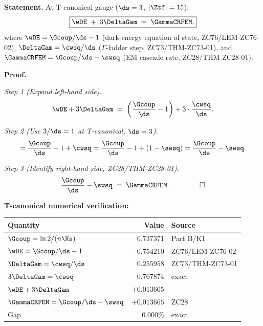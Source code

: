 \documentclass[12pt, a4paper]{article}
\begin{document}

\begin{formalbox}[title={THM-ZC82-01: Cosmological-Ladder Identity
  ($R_0$, Exact)}]

\textbf{Statement.}
At T-canonical gauge ($\ds = 3$, $|\Ztf| = 15$):
\begin{equation}
  \boxed{
    \wDE \;+\; 3\DeltaGam \;=\; \GammaCRFEM,
  }
  \label{eq:cosmo-ladder}
\end{equation}
where $\wDE = \Gcoup/\ds - 1$ (dark-energy equation of state,
ZC76/LEM-ZC76-02), $\DeltaGam = \cwsq/\ds$ ($\Gamma$-ladder step,
ZC73/THM-ZC73-01), and $\GammaCRFEM = \Gcoup/\ds - \swsq$
(EM cascade rate, ZC28/THM-ZC28-01).

\textbf{Proof.}

\textit{Step 1 (Expand left-hand side).}
\begin{equation}
  \wDE + 3\DeltaGam
  \;=\; \left(\frac{\Gcoup}{\ds} - 1\right)
       + 3\cdot\frac{\cwsq}{\ds}.
  \label{eq:expand}
\end{equation}

\textit{Step 2 (Use $3/\ds = 1$ at T-canonical, $\ds = 3$).}
\begin{equation}
  = \frac{\Gcoup}{\ds} - 1 + \cwsq
  = \frac{\Gcoup}{\ds} - 1 + (1 - \swsq)
  = \frac{\Gcoup}{\ds} - \swsq.
  \label{eq:simplify}
\end{equation}

\textit{Step 3 (Identify right-hand side, ZC28/THM-ZC28-01).}
\[
  \frac{\Gcoup}{\ds} - \swsq \;=\; \GammaCRFEM.
  \hspace{1.5cm}\square
\]

\textbf{T-canonical numerical verification:}
\begin{center}
{\small\renewcommand{\arraystretch}{1.25}
\begin{tabular}{@{}lrl@{}}
\toprule
Quantity & Value & Source \\
\midrule
$\Gcoup = \ln2/(n\Ks)$         & $0.737371$ & Part B/K1 \\
$\wDE = \Gcoup/\ds - 1$         & $-0.754210$ & ZC76/LEM-ZC76-02 \\
$\DeltaGam = \cwsq/\ds$         & $0.255958$ & ZC73/THM-ZC73-01 \\
$3\DeltaGam = \cwsq$            & $0.767874$ & exact \\
$\wDE + 3\DeltaGam$             & $+0.013665$ & \\
$\GammaCRFEM = \Gcoup/\ds-\swsq$ & $+0.013665$ & ZC28 \\
Gap                              & $0.000\%$ & exact \\
\bottomrule
\end{tabular}}
\end{center}


\end{formalbox}
\end{document}
